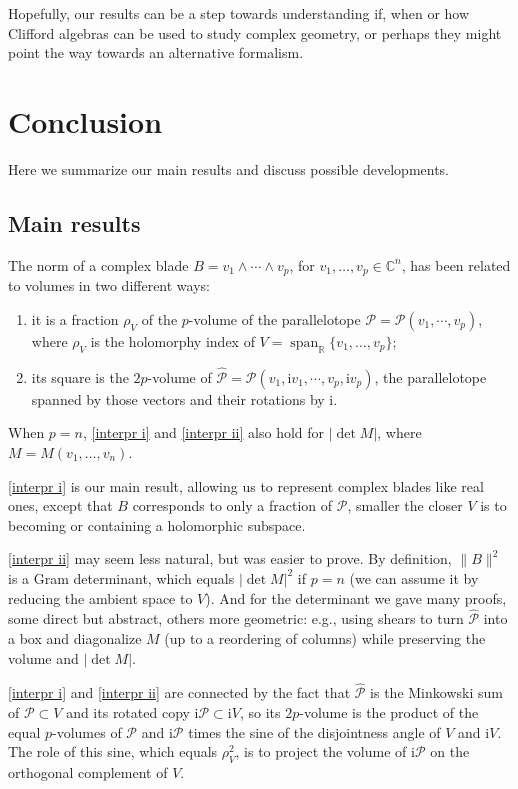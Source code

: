 \documentclass{birkjour}
\theoremstyle{definition}
\def\R			{\mathds{R}}
\def\C			{\mathds{C}}
\def\PP			{\mathcal{P}}
\def\im	 					{\mathrm{i}}				%
\DeclareMathOperator{\Span}{span}
\begin{document}
Hopefully, our results can be a step towards understanding if, when or how Clifford algebras can be used to study complex geometry, or perhaps they might point the way towards an alternative formalism.




\section{Conclusion}\label{sc:Conclusion}

Here we summarize our main results and discuss possible developments.

\subsection{Main results}

The norm of a complex blade $B = v_1 \wedge \cdots \wedge v_p$, for $v_1,\ldots,v_p \in \C^n$, has been related to volumes in two different ways:
\begin{enumerate}[label = (\roman*)]
	\item it is a fraction $\rho_V$ of the $p$-volume of the parallelotope $\PP = \PP(v_1,\cdots,v_p)$, where $\rho_V$ is the holomorphy index of $V=\Span_\R\{v_1,\ldots,v_p\}$;\label{interpr i}
	\item its square is the $2p$-volume of $\hat{\PP} = \PP(v_1,\im v_1,\cdots,v_p, \im v_p)$, the parallelotope spanned by those vectors and their rotations by $\im$.\label{interpr ii}
\end{enumerate}
When $p=n$, \ref{interpr i} and \ref{interpr ii} also hold for $|\det M|$, where $M = M(v_1,\ldots,v_n)$.

\ref{interpr i} is our main result, allowing us to represent complex blades like real ones, except that $B$ corresponds to only a fraction of $\PP$, smaller the closer $V$ is to becoming or containing a holomorphic subspace.

\ref{interpr ii} may seem less natural, but was easier to prove. By definition, $\|B\|^2$ is a Gram determinant, which equals $|\det M|^2$ if $p=n$ (we can assume it by reducing the ambient space to $V$).
And for the determinant we gave many proofs, some direct but abstract, others more geometric: e.g., using shears to turn $\hat{\PP}$ into a box and diagonalize $M$ (up to a reordering of columns) while preserving the volume and $|\det M|$.

\ref{interpr i} and \ref{interpr ii} are connected by the fact that $\hat{\PP}$ is the Minkowski sum of $\PP \subset V$ and its rotated copy $\im \PP \subset \im V$, so its $2p$-volume is the product of the equal $p$-volumes of $\PP$ and $\im \PP$ times the sine of the disjointness angle of $V$ and $\im V$. The role of this sine, which equals $\rho_V^2$, is to project the volume of $\im \PP$ on the orthogonal complement of $V$.
\end{document}

